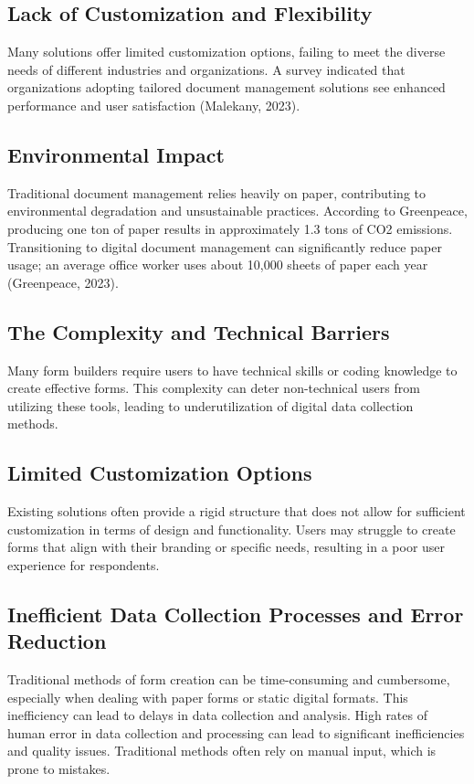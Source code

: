 \subsection{Lack of Customization and Flexibility}
Many solutions offer limited customization options, failing to meet the diverse needs of different industries and organizations. A survey indicated that organizations adopting tailored document management solutions see enhanced performance and user satisfaction (Malekany, 2023).

\subsection{Environmental Impact}
Traditional document management relies heavily on paper, contributing to environmental degradation and unsustainable practices. According to Greenpeace, producing one ton of paper results in approximately 1.3 tons of CO2 emissions. Transitioning to digital document management can significantly reduce paper usage; an average office worker uses about 10,000 sheets of paper each year (Greenpeace, 2023).

\subsection{The Complexity and Technical Barriers}
Many form builders require users to have technical skills or coding knowledge to create effective forms. This complexity can deter non-technical users from utilizing these tools, leading to underutilization of digital data collection methods.

\subsection{Limited Customization Options}
Existing solutions often provide a rigid structure that does not allow for sufficient customization in terms of design and functionality. Users may struggle to create forms that align with their branding or specific needs, resulting in a poor user experience for respondents.

\subsection{Inefficient Data Collection Processes and Error Reduction}
Traditional methods of form creation can be time-consuming and cumbersome, especially when dealing with paper forms or static digital formats. This inefficiency can lead to delays in data collection and analysis. High rates of human error in data collection and processing can lead to significant inefficiencies and quality issues. Traditional methods often rely on manual input, which is prone to mistakes.


